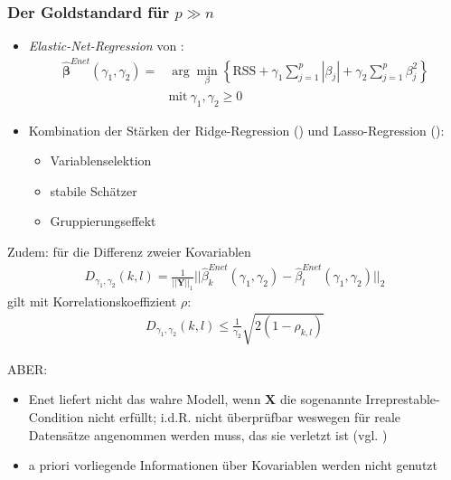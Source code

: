\documentclass{beamer}
\begin{document}
\begin{frame}
\frametitle{Der \glqq Goldstandard{\grqq} für $p \gg n$}
	\begin{itemize}
	\item \textit{Elastic-Net-Regression} von \cite{zou_regularization_2005}:
	\begin{align*}
	\boldsymbol{\hat{\beta}}^{Enet}(\gamma_1, \gamma_2)=&\arg \displaystyle\min_{\beta} \left\lbrace \text{RSS}  + \gamma_1 \sum_{j=1}^{p}|\beta_j| + \gamma_2 \sum_{j=1}^{p}\beta_j^2 \right\rbrace\\ &\text{mit} \ \gamma_1,\gamma_2 \ge 0
	\end{align*}
	\item Kombination der Stärken der Ridge-Regression (\cite{hoerl_ridge_1970}) und Lasso-Regression (\cite{tibshirani96regression}):
	\begin{itemize}
	\item Variablenselektion 
	\item stabile Schätzer
	\item Gruppierungseffekt
	\end{itemize}	
	\end{itemize}
\end{frame}

\begin{frame}
	Zudem: für die Differenz zweier Kovariablen
		\begin{align*}
		D_{\gamma_1,\gamma_2}(k,l)=\frac{1}{||\mathbf{Y}||_1}||\hat{\beta}_k^{Enet}(\gamma_1,\gamma_2)-\hat{\beta}_l^{Enet}(\gamma_1,\gamma_2)||_2
		\end{align*}
		gilt mit Korrelationskoeffizient $\rho$:
		\begin{align*}
		D_{\gamma_1,\gamma_2}(k,l) \leq \frac{1}{\gamma_2}\sqrt{2(1-\rho_{k,l})}
		\end{align*}
\end{frame}

\begin{frame}
	ABER:
	\begin{itemize}
	\item Enet liefert nicht das wahre Modell, wenn $\mathbf{X}$ die sogenannte Irreprestable-Condition nicht erfüllt; i.d.R. nicht überprüfbar weswegen für reale Datensätze angenommen werden muss, das sie verletzt ist (vgl. \cite{jia_2008Enet_Consistency})
	\item a priori vorliegende Informationen über Kovariablen werden nicht genutzt
	\end{itemize}
\end{frame}
\end{document}
